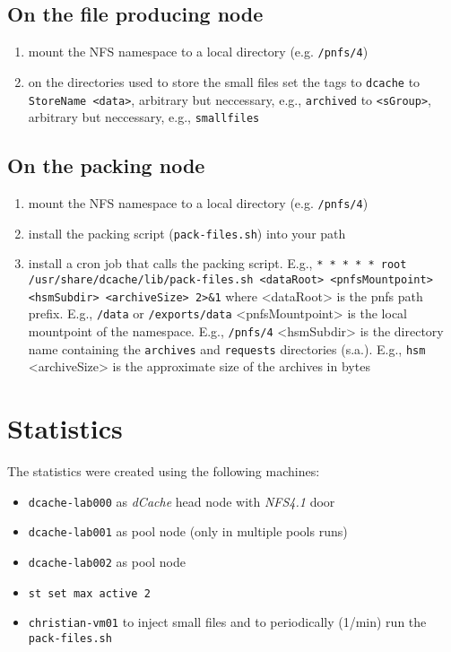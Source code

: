 \documentclass[a4paper,8pt]{scrartcl}
\begin{document}
\subsection{On the file producing node}
\begin{enumerate}
  \item mount the NFS namespace to a local directory (e.g. \texttt{/pnfs/4})
  \item on the directories used to store the small files set the tags
     to \texttt{dcache}
     to \texttt{StoreName <data>}, arbitrary but neccessary, e.g., \texttt{archived}
     to \texttt{<sGroup>}, arbitrary but neccessary, e.g., \texttt{smallfiles}
\end{enumerate}

\subsection{On the packing node}
\begin{enumerate}
  \item mount the NFS namespace to a local directory (e.g. \texttt{/pnfs/4})
  \item install the packing script (\texttt{pack-files.sh}) into your path
  \item install a cron job that calls the packing script. E.g., 
    \subitem \texttt{*  *  *  *  * root /usr/share/dcache/lib/pack-files.sh <dataRoot> <pnfsMountpoint> <hsmSubdir> <archiveSize> 2>\&1}
    \subitem where <dataRoot> is the pnfs path prefix. E.g., \texttt{/data} or \texttt{/exports/data}
    \subitem <pnfsMountpoint> is the local mountpoint of the namespace. E.g., \texttt{/pnfs/4}
    \subitem <hsmSubdir> is the directory name containing the \texttt{archives} and \texttt{requests} directories (s.a.). E.g., \texttt{hsm}
    \subitem <archiveSize> is the approximate size of the archives in bytes
\end{enumerate}

\section{Statistics}
The statistics were created using the following machines:
\begin{itemize}
  \item \texttt{dcache-lab000} as \emph{dCache} head node with \emph{NFS4.1} door
  \item \texttt{dcache-lab001} as pool node (only in multiple pools runs)
  \item \texttt{dcache-lab002} as pool node
  \item \texttt{st set max active 2}
  \item \texttt{christian-vm01} to inject small files and to periodically (1/min) run the \texttt{pack-files.sh}
\end{itemize}
\end{document}
